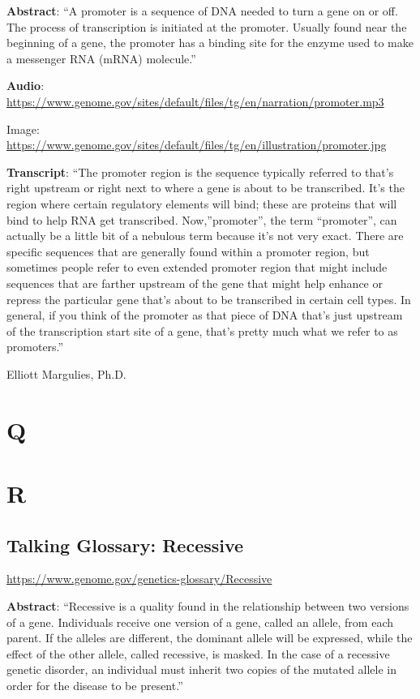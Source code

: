 \documentclass[
]{book}
\begin{document}
\textbf{Abstract}: ``A promoter is a sequence of DNA needed to turn a gene on or off. The process of transcription is initiated at the promoter. Usually found near the beginning of a gene, the promoter has a binding site for the enzyme used to make a messenger RNA (mRNA) molecule.''

\textbf{Audio}: \url{https://www.genome.gov/sites/default/files/tg/en/narration/promoter.mp3}

Image: \url{https://www.genome.gov/sites/default/files/tg/en/illustration/promoter.jpg}

\textbf{Transcript}: ``The promoter region is the sequence typically referred to that's right upstream or right next to where a gene is about to be transcribed. It's the region where certain regulatory elements will bind; these are proteins that will bind to help RNA get transcribed. Now,''promoter'', the term ``promoter'', can actually be a little bit of a nebulous term because it's not very exact. There are specific sequences that are generally found within a promoter region, but sometimes people refer to even extended promoter region that might include sequences that are farther upstream of the gene that might help enhance or repress the particular gene that's about to be transcribed in certain cell types. In general, if you think of the promoter as that piece of DNA that's just upstream of the transcription start site of a gene, that's pretty much what we refer to as promoters.''

Elliott Margulies, Ph.D.

\hypertarget{q}{%
\chapter{Q}\label{q}}

\hypertarget{r}{%
\chapter{R}\label{r}}

\hypertarget{talking-glossary-recessive}{%
\section{Talking Glossary: Recessive}\label{talking-glossary-recessive}}

\url{https://www.genome.gov/genetics-glossary/Recessive}

\textbf{Abstract}: ``Recessive is a quality found in the relationship between two versions of a gene. Individuals receive one version of a gene, called an allele, from each parent. If the alleles are different, the dominant allele will be expressed, while the effect of the other allele, called recessive, is masked. In the case of a recessive genetic disorder, an individual must inherit two copies of the mutated allele in order for the disease to be present.''
\end{document}
